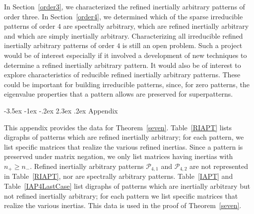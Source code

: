 \documentclass[10pt]{amsart}
\begin{document}
In Section~\ref{order3}, we characterized the refined inertially arbitrary patterns of order three. In
Section~\ref{order4}, we determined which of the sparse irreducible patterns of order $4$ 
are spectrally arbitrary, which are refined inertially arbitrary and which are simply inertially arbitrary.
Characterizing all irreducible refined inertially arbitrary patterns of order $4$ is still an open problem. 
Such a project would be of interest especially if it involved a development of new techniques to determine
a refined inertially arbitrary pattern. 
It would also be of interest to explore characteristics of reducible refined inertially arbitrary patterns. 
These could be important for building irreducible patterns, since, for zero patterns, the eigenvalue 
properties that a pattern allows are preserved for superpatterns.

{               
                                      {-3.5ex \@plus -1ex \@minus -.2ex}                                      {2.3ex \@plus.2ex}                                                      {\normalfont\bfseries}}{Appendix}

This appendix provides the data for Theorem~\ref{seven}.
Table~\ref{RIAPT} lists digraphs of patterns which are refined inertially arbitrary; for each pattern, we list specific matrices that realize the various refined inertias. Since a pattern is preserved under matrix negation,
we only list matrices having inertias with $n_+\geq n_-$. Refined inertially arbitrary patterns 
${\mathcal{P}}_{4,1}$ and ${\mathcal{P}}_{4,2}$ are not represented in Table~\ref{RIAPT}, nor are spectrally arbitrary patterns. 
 Table~\ref{IAPT} and Table~\ref{IAP4LastCase} list digraphs of patterns which are inertially arbitrary but not refined inertially arbitrary;  for each pattern we list specific matrices that realize the various inertias. 
 This data is used in the proof of Theorem~\ref{seven}. 
\end{document}
